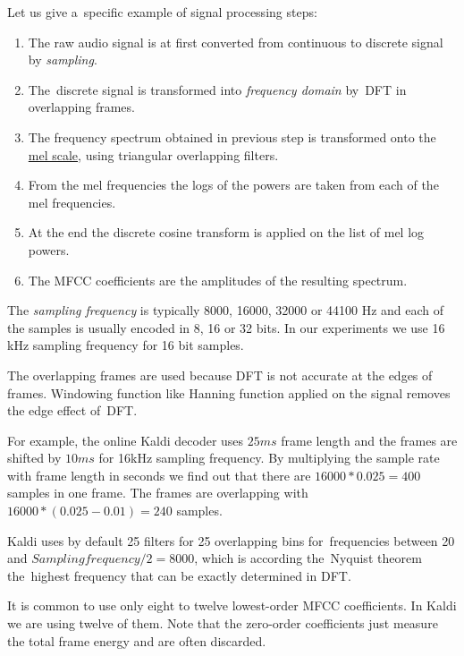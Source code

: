 Let us give a~specific example of signal processing steps: 
\small{\begin{enumerate}
    \item The raw audio signal is at first converted from continuous to discrete signal by {\it sampling}.  %
    \item The~discrete signal is transformed into {\it frequency domain}\/ by~\ac{DFT} in overlapping frames.
    \item The frequency spectrum obtained in previous step is transformed onto the \href{https://en.wikipedia.org/wiki/Mel_scale}{mel scale}, using triangular overlapping filters.
    \item From the mel frequencies the logs of the powers are taken from each of the mel frequencies.
    \item At the end the discrete cosine transform is applied on the list of mel log powers.
    \item The \ac{MFCC} coefficients are the amplitudes of the resulting spectrum.
\end{enumerate}
The {\it sampling frequency}\/ is typically 8000, 16000, 32000 or 44100 Hz and each of the samples is usually encoded in 8, 16 or 32 bits. In our experiments we use 16 kHz sampling frequency for 16 bit samples.  

The overlapping frames are used because \ac{DFT} is not accurate at the edges of frames. 
Windowing function like Hanning function applied on the signal removes the edge effect of~\ac{DFT}. 

For example,  the online Kaldi decoder uses $25ms$  frame length and the frames are shifted by $10ms$ for 16kHz sampling frequency. By multiplying the sample rate with frame length in seconds we find out that there are  $16000 * 0.025 = 400$ samples in one frame. The frames are overlapping with $ 16000 * (0.025 - 0.01) = 240$ samples.

Kaldi uses by default 25 filters for 25 overlapping bins for~frequencies 
between 20 and  $Sampling frequency / 2 = 8000$, 
which is according the~Nyquist theorem\cite{jerri1977shannon} 
the~highest frequency that can be exactly determined in \ac{DFT}.

It is common to use only eight to twelve lowest-order \ac{MFCC} coefficients. In Kaldi we are using twelve of them. 
Note that the zero-order coefficients just measure the total frame energy and are often discarded.
} %

